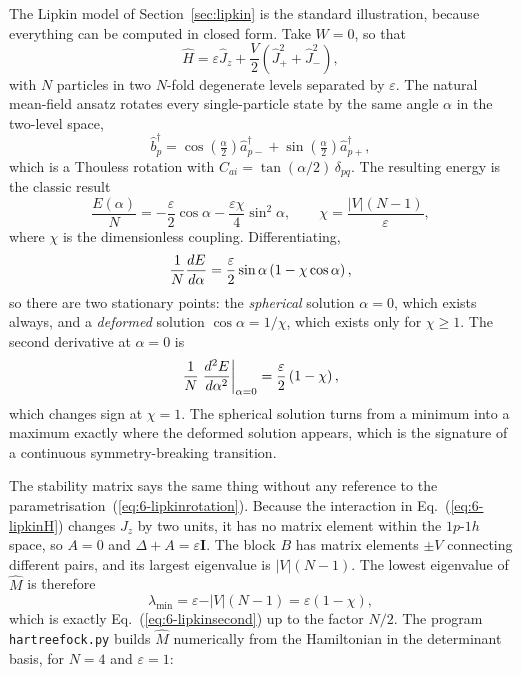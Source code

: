 The Lipkin model of Section~\ref{sec:lipkin} is the standard illustration,
because everything can be computed in closed form.  Take $W=0$, so that
\begin{equation}
  \hat{H} = \varepsilon\hat{J}_z
    + \frac{V}{2}\left(\hat{J}_+^2+\hat{J}_-^2\right),
  \label{eq:6-lipkinH}
\end{equation}
with $N$ particles in two $N$-fold degenerate levels separated by
$\varepsilon$.  The natural mean-field ansatz rotates every single-particle
state by the same angle $\alpha$ in the two-level space,
\begin{equation}
  \hat{b}^{\dagger}_{p} = \cos\!\left(\tfrac{\alpha}{2}\right)
    \hat{a}^{\dagger}_{p-}
    + \sin\!\left(\tfrac{\alpha}{2}\right)\hat{a}^{\dagger}_{p+},
  \label{eq:6-lipkinrotation}
\end{equation}
which is a Thouless rotation with $C_{ai}=\tan(\alpha/2)\,\delta_{pq}$.  The
resulting energy is the classic result
\begin{equation}
  \frac{E(\alpha)}{N} = -\frac{\varepsilon}{2}\cos\alpha
    - \frac{\varepsilon\chi}{4}\sin^2\alpha,
  \qquad
  \chi = \frac{\vert V\vert (N-1)}{\varepsilon},
  \label{eq:6-lipkinmeanfield}
\end{equation}
where $\chi$ is the dimensionless coupling.  Differentiating,
\begin{equation}
  \frac{1}{N}\frac{dE}{d\alpha}
   = \frac{\varepsilon}{2}\sin\alpha
     \left(1-\chi\cos\alpha\right),
  \label{eq:6-lipkinderivative}
\end{equation}
so there are two stationary points: the \emph{spherical} solution
$\alpha=0$, which exists always, and a \emph{deformed} solution
$\cos\alpha=1/\chi$, which exists only for $\chi\ge1$.  The second
derivative at $\alpha=0$ is
\begin{equation}
  \frac{1}{N}\left.\frac{d^2E}{d\alpha^2}\right\vert_{\alpha=0}
   = \frac{\varepsilon}{2}\left(1-\chi\right),
  \label{eq:6-lipkinsecond}
\end{equation}
which changes sign at $\chi=1$.  The spherical solution turns from a minimum
into a maximum exactly where the deformed solution appears, which is the
signature of a continuous symmetry-breaking transition.

The stability matrix says the same thing without any reference to the
parametrisation~(\ref{eq:6-lipkinrotation}).  Because the interaction
in Eq.~(\ref{eq:6-lipkinH}) changes $J_z$ by two units, it has no matrix
element within the $1p$-$1h$ space, so $A=0$ and $\Delta+A=\varepsilon\bm{I}$.
The block $B$ has matrix elements $\pm V$ connecting different pairs, and its
largest eigenvalue is $\vert V\vert(N-1)$.  The lowest eigenvalue of
$\hat{M}$ is therefore
\begin{equation}
  \lambda_{\min} = \varepsilon - \vert V\vert(N-1)
    = \varepsilon\left(1-\chi\right),
  \label{eq:6-lipkinlowest}
\end{equation}
which is exactly Eq.~(\ref{eq:6-lipkinsecond}) up to the factor $N/2$.
The program \texttt{hartreefock.py} builds $\hat{M}$ numerically from the
Hamiltonian in the determinant basis, for $N=4$ and $\varepsilon=1$:

